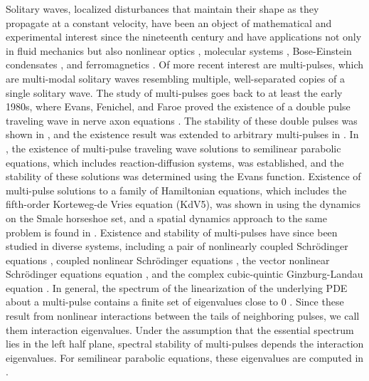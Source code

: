 \documentclass[10pt,reqno]{amsart}
\theoremstyle{plain}
\theoremstyle{definition}
\theoremstyle{remark}
\numberwithin{theorem}{section}
\numberwithin{equation}{section}
\begin{document}
Solitary waves, localized disturbances that maintain their shape as they propagate at a constant velocity, have been an object of mathematical and experimental interest since the nineteenth century \cite{KdVoriginal} and have applications not only in fluid mechanics but also nonlinear optics \cite{Taylor1992}, molecular systems \cite{Davydov1985}, Bose-Einstein condensates \cite{Panos2008BEC}, and ferromagnetics \cite{Kosevich1998}. Of more recent interest are multi-pulses, which are multi-modal solitary waves resembling multiple, well-separated copies of a single solitary wave. The study of multi-pulses goes back to at least the early 1980s, where Evans, Fenichel, and Faroe proved the existence of a double pulse traveling wave in nerve axon equations \cite{Evans1982}. The stability of these double pulses was shown in \cite{Yanagida1989}, and the existence result was extended to arbitrary multi-pulses in \cite{Feroe1986}. In \cite{Alexander1994}, the existence of multi-pulse traveling wave solutions to semilinear parabolic equations, which includes reaction-diffusion systems, was established, and the stability of these solutions was determined using the Evans function. Existence of multi-pulse solutions to a family of Hamiltonian equations, which includes the fifth-order Korteweg-de Vries equation (KdV5), was shown in \cite{Buffoni1996} using the dynamics on the Smale horseshoe set, and a spatial dynamics approach to the same problem is found in \cite{SandstedeStrut}. Existence and stability of multi-pulses have since been studied in diverse systems, including a pair of nonlinearly coupled Schr\"{o}dinger equations \cite{Yew2001,Yew2000}, coupled nonlinear Schr\"{o}dinger equations \cite{Pelinovsky2001,Pelinovsky2005}, the vector nonlinear Schr\"{o}dinger equations equation \cite{Kapitula2007}, and the complex cubic-quintic Ginzburg-Landau equation \cite{Manukian2009}. In general, the spectrum of the linearization of the underlying PDE about a multi-pulse contains a finite set of eigenvalues close to 0 \cite{Alexander1990,Sandstede1998}. Since these result from nonlinear interactions between the tails of neighboring pulses, we call them interaction eigenvalues. Under the assumption that the essential spectrum lies in the left half plane, spectral stability of multi-pulses depends the interaction eigenvalues. For semilinear parabolic equations, these eigenvalues are computed in \cite{Sandstede1998}. 
\end{document}
